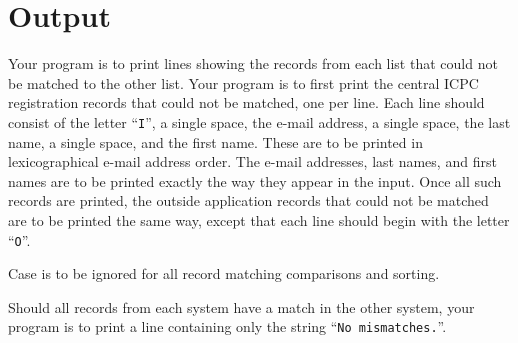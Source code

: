 \section*{Output}

Your program is to print lines showing the
records from each list that could not be matched to the other list.
Your program is to first print the central ICPC registration records
that could not be matched, one per line.  Each line should consist of
the letter ``{\tt I}'', a single space, the e-mail address, a single space,
the last name, a single space, and the first name.  These are to be
printed in lexicographical e-mail address order.  The e-mail addresses, last
names, and first names are to be printed
exactly the way they appear in the input.  Once all such records are
printed, the outside application records that could not be matched
are to be printed the same way, except that each line should begin
with the letter ``{\tt O}''.
\par
Case is to be ignored for all record matching comparisons and sorting.
\par
Should all records from each system have a match in the other system,
your program is to print a line containing only the
string ``{\tt No mismatches.}''.
